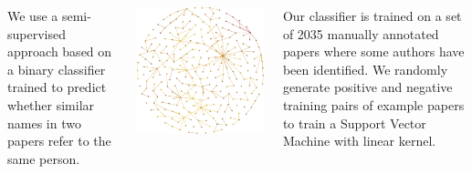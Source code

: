 \documentclass[30pt,a1paper]{tikzposter}
\begin{document}
\begin{columns}
{    We use a semi-supervised approach based on a binary
    classifier trained to predict whether similar names in two
    papers refer to the same person.

    \hspace{-1.3cm}
    \includegraphics[scale=0.7]{figures/clustering.eps}

    Our classifier is trained on a set of 2035 manually annotated
    papers where some authors have been identified. We randomly
    generate positive and negative training pairs of example
    papers to train a Support Vector Machine with linear kernel.
}






\end{columns}
\end{document}
